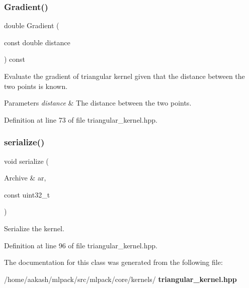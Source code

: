 \subsubsection{Gradient()}
{\footnotesize\ttfamily double Gradient (\begin{DoxyParamCaption}\item[{const double}]{distance }\end{DoxyParamCaption}) const\hspace{0.3cm}{\ttfamily [inline]}}



Evaluate the gradient of triangular kernel given that the distance between the two points is known. 


\begin{DoxyParams}{Parameters}
{\em distance} & The distance between the two points. \\
\hline
\end{DoxyParams}


Definition at line 73 of file triangular\+\_\+kernel.\+hpp.

\mbox{\label{classmlpack_1_1kernel_1_1TriangularKernel_a65cba07328997659bec80b9879b15a51}} 
\subsubsection{serialize()}
{\footnotesize\ttfamily void serialize (\begin{DoxyParamCaption}\item[{Archive \&}]{ar,  }\item[{const uint32\+\_\+t}]{ }\end{DoxyParamCaption})\hspace{0.3cm}{\ttfamily [inline]}}



Serialize the kernel. 



Definition at line 96 of file triangular\+\_\+kernel.\+hpp.



The documentation for this class was generated from the following file\+:\begin{DoxyCompactItemize}
\item 
/home/aakash/mlpack/src/mlpack/core/kernels/\textbf{ triangular\+\_\+kernel.\+hpp}\end{DoxyCompactItemize}
